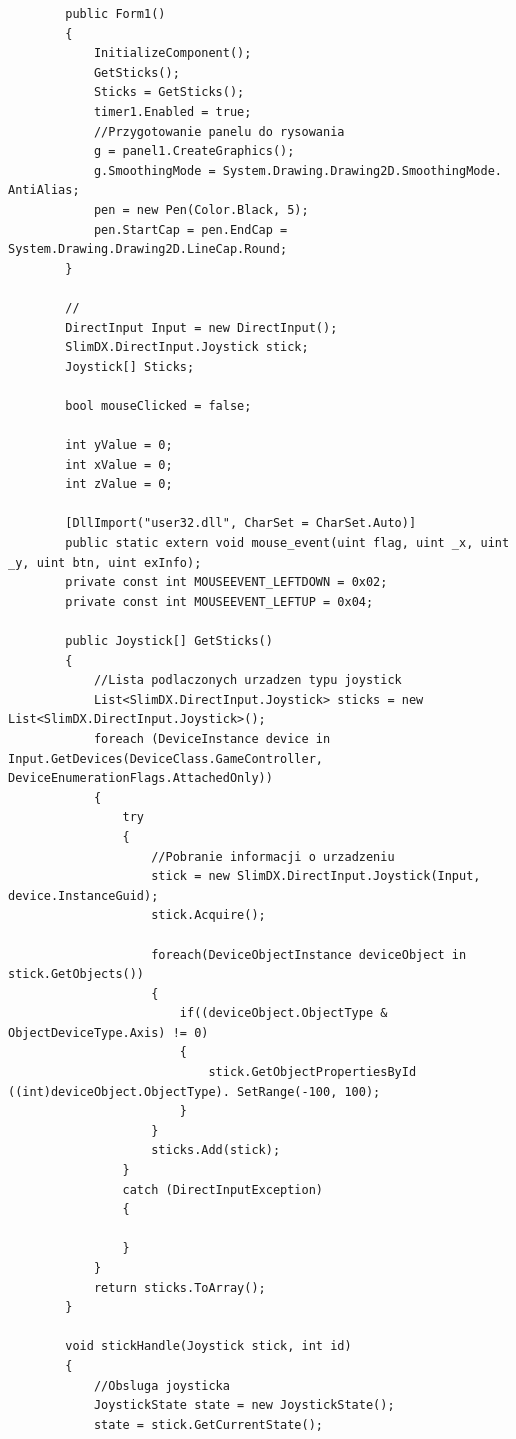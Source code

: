 \documentclass[12pt,a4paper,notitlepage]{report}
\begin{document}
\begin{adjustwidth}{0pt}{-50pt}
\begin{lstlisting}
        public Form1()
        {
            InitializeComponent();
            GetSticks();
            Sticks = GetSticks();
            timer1.Enabled = true;
            //Przygotowanie panelu do rysowania
            g = panel1.CreateGraphics();
            g.SmoothingMode = System.Drawing.Drawing2D.SmoothingMode. AntiAlias;
            pen = new Pen(Color.Black, 5);
            pen.StartCap = pen.EndCap = System.Drawing.Drawing2D.LineCap.Round;
        }
		
		//
        DirectInput Input = new DirectInput();
        SlimDX.DirectInput.Joystick stick;
        Joystick[] Sticks;

        bool mouseClicked = false;

        int yValue = 0;
        int xValue = 0;
        int zValue = 0;

        [DllImport("user32.dll", CharSet = CharSet.Auto)]
        public static extern void mouse_event(uint flag, uint _x, uint _y, uint btn, uint exInfo);
        private const int MOUSEEVENT_LEFTDOWN = 0x02;
        private const int MOUSEEVENT_LEFTUP = 0x04;
        
        public Joystick[] GetSticks()
        {
        	//Lista podlaczonych urzadzen typu joystick
            List<SlimDX.DirectInput.Joystick> sticks = new List<SlimDX.DirectInput.Joystick>();
            foreach (DeviceInstance device in Input.GetDevices(DeviceClass.GameController, DeviceEnumerationFlags.AttachedOnly))
            {
                try
                {
                	//Pobranie informacji o urzadzeniu
                    stick = new SlimDX.DirectInput.Joystick(Input, device.InstanceGuid);
                    stick.Acquire();

                    foreach(DeviceObjectInstance deviceObject in stick.GetObjects())
                    {
                        if((deviceObject.ObjectType & ObjectDeviceType.Axis) != 0)
                        {
                            stick.GetObjectPropertiesById ((int)deviceObject.ObjectType). SetRange(-100, 100);
                        }
                    }
                    sticks.Add(stick);
                }
                catch (DirectInputException)
                {
                    
                }
            }
            return sticks.ToArray();
        }

        void stickHandle(Joystick stick, int id)
        {
        	//Obsluga joysticka
            JoystickState state = new JoystickState();
            state = stick.GetCurrentState();
           

\end{lstlisting}
\end{adjustwidth}
\end{document}
